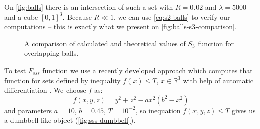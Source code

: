 \documentclass[reprint,amsmath,amssymb,aps,pre,showkeys,showpacs]{revtex4-1}
\begin{document}
On \cref{fig:balls} there is an intersection of such a set with $R = 0.02$ and
$\lambda=5000$ and a cube $[0, 1]^3$. Because $R \ll 1$, we can use
\cref{eq:s2-balls} to verify our computations -- this is exactly what we present on
\cref{fig:balls-s3-comparison}.
\begin{figure}[tp]
  \centering
  \hfill
  \caption[]{A comparison of calculated and theoretical values of $S_3$ function
    for overlapping balls.}
  \label{fig:s3-verification}
\end{figure}

To test $F_{sss}$ function we use a recently developed approach which computes
that function for sets defined by inequality $f(x) \le T$, $x \in \mathbb{R}^3$
with help of automatic differentiation \cite{postnicov20232}. We choose $f$ as:
\begin{equation}
  f(x, y, z) = y^2 + z^2 - a x^2 (b^2 - x^2)
\end{equation}
and parameters $a = 10$, $b = 0.45$, $T = 10^{-2}$, so inequation
$f(x, y, z) \le T$ gives us a dumbbell-like object (\cref{fig:sss-dumbbell}).
\end{document}
